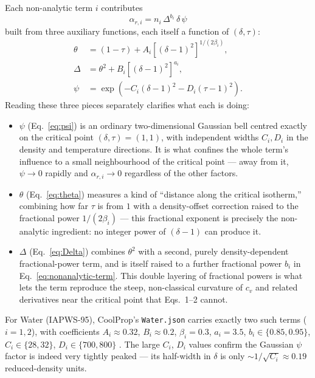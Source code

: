 \documentclass[11pt]{article}
\begin{document}
Each non-analytic term $i$ contributes
\begin{equation}
  \alpha_{r,i} = n_i\, \Delta^{b_i}\, \delta\, \psi
  \label{eq:nonanalytic-term}
\end{equation}
built from three auxiliary functions, each itself a function of $(\delta,\tau)$:
\begin{align}
  \theta &= (1-\tau) + A_i\left[(\delta-1)^2\right]^{1/(2\beta_i)},
  \label{eq:theta} \\
  \Delta &= \theta^2 + B_i\left[(\delta-1)^2\right]^{a_i},
  \label{eq:Delta} \\
  \psi &= \exp\!\left(-C_i(\delta-1)^2 - D_i(\tau-1)^2\right).
  \label{eq:psi}
\end{align}
Reading these three pieces separately clarifies what each is doing:

\begin{itemize}[leftmargin=1.5em]
  \item $\psi$ (Eq.~\ref{eq:psi}) is an ordinary two-dimensional Gaussian
    bell centred exactly on the critical point $(\delta,\tau)=(1,1)$, with
    independent widths $C_i, D_i$ in the density and temperature directions.
    It is what confines the whole term's influence to a small neighbourhood
    of the critical point — away from it, $\psi \to 0$ rapidly and
    $\alpha_{r,i} \to 0$ regardless of the other factors.
  \item $\theta$ (Eq.~\ref{eq:theta}) measures a kind of ``distance along the
    critical isotherm,'' combining how far $\tau$ is from $1$ with a
    density-offset correction raised to the fractional power
    $1/(2\beta_i)$ — this fractional exponent is precisely the
    non-analytic ingredient: no integer power of $(\delta-1)$ can produce it.
  \item $\Delta$ (Eq.~\ref{eq:Delta}) combines $\theta^2$ with a second,
    purely density-dependent fractional-power term, and is itself raised to
    a further fractional power $b_i$ in Eq.~\ref{eq:nonanalytic-term}. This
    double layering of fractional powers is what lets the term reproduce
    the steep, non-classical curvature of $c_v$ and related derivatives near
    the critical point that Eqs.~1--2 cannot.
\end{itemize}

For Water (IAPWS-95), CoolProp's \texttt{Water.json} carries exactly two
such terms ($i=1,2$), with coefficients $A_i \approx 0.32$,
$B_i \approx 0.2$, $\beta_i = 0.3$, $a_i = 3.5$, $b_i \in \{0.85, 0.95\}$,
$C_i \in \{28, 32\}$, $D_i \in \{700, 800\}$ \cite{coolprop}. The large $C_i$,
$D_i$ values confirm the Gaussian $\psi$ factor is indeed very tightly
peaked — its half-width in $\delta$ is only $\sim 1/\sqrt{C_i} \approx 0.19$
reduced-density units.
\end{document}
